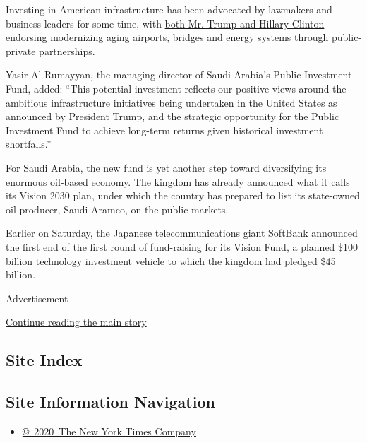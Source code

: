 Investing in American infrastructure has been advocated by lawmakers and
business leaders for some time, with
\href{https://www.nytimes3xbfgragh.onion/2016/08/03/us/politics/trump-clinton-infrastructure.html}{both
Mr. Trump and Hillary Clinton} endorsing modernizing aging airports,
bridges and energy systems through public-private partnerships.

Yasir Al Rumayyan, the managing director of Saudi Arabia's Public
Investment Fund, added: ``This potential investment reflects our
positive views around the ambitious infrastructure initiatives being
undertaken in the United States as announced by President Trump, and the
strategic opportunity for the Public Investment Fund to achieve
long-term returns given historical investment shortfalls.''

For Saudi Arabia, the new fund is yet another step toward diversifying
its enormous oil-based economy. The kingdom has already announced what
it calls its Vision 2030 plan, under which the country has prepared to
list its state-owned oil producer, Saudi Aramco, on the public markets.

Earlier on Saturday, the Japanese telecommunications giant SoftBank
announced
\href{http://www.businesswire.com/news/home/20170520005010/en/SoftBank-Vision-Fund-Announces-Major-Close}{the
first end of the first round of fund-raising for its Vision Fund}, a
planned \$100 billion technology investment vehicle to which the kingdom
had pledged \$45 billion.

Advertisement

\protect\hyperlink{after-bottom}{Continue reading the main story}

\hypertarget{site-index}{%
\subsection{Site Index}\label{site-index}}

\hypertarget{site-information-navigation}{%
\subsection{Site Information
Navigation}\label{site-information-navigation}}

\begin{itemize}
\tightlist
\item
  \href{https://help.nytimes3xbfgragh.onion/hc/en-us/articles/115014792127-Copyright-notice}{©~2020~The
  New York Times Company}
\end{itemize}

